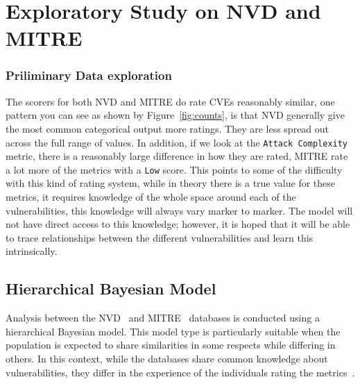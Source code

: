 \documentclass[12pt]{article}
\begin{document}

\section{Exploratory Study on NVD and MITRE}



\subsubsection{Priliminary Data exploration}

The scorers for both NVD and MITRE do rate CVEs reasonably similar, one pattern you can see as shown
by Figure~\ref{fig:counts}, is that NVD generally give the most common categorical output more ratings.
They are less spread out across the full range of values. In addition, if we look at the
\texttt{Attack Complexity} metric, there is a reasonably large difference in how they are rated,
MITRE rate a lot more of the metrics with a \texttt{Low} score. This points to some of the
difficulty with this kind of rating system, while in theory there is a true value for these metrics,
it requires knowledge of the whole space around each of the vulnerabilities, this knowledge will
always vary marker to marker. The model will not have direct access to this knowledge; however, it
is hoped that it will be able to trace relationships between the different vulnerabilities and learn
this intrinsically.

\subsection{Hierarchical Bayesian Model} \label{bayesian_modeling}

Analysis between the NVD~\cite{NVD} and MITRE~\cite{MITRE} databases is conducted using a
hierarchical Bayesian model. This model type is particularly suitable when the population is
expected to share similarities in some respects while differing in others. In this context, while
the databases share common knowledge about vulnerabilities, they differ in the experience of the
individuals rating the metrics~\cite{bayes}.
\end{document}
